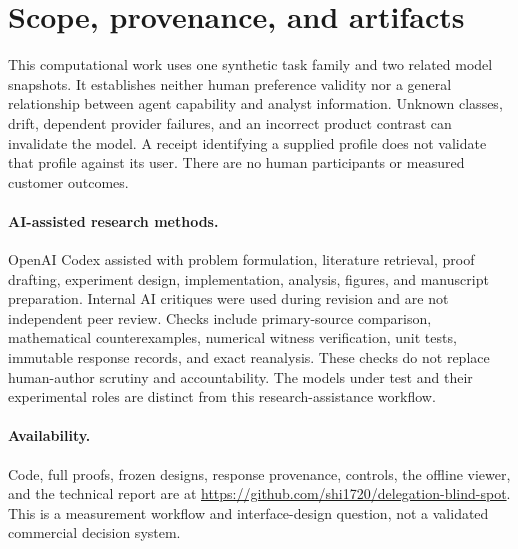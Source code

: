 \documentclass[manuscript,review,anonymous]{acmart}
\begin{document}
\section{Scope, provenance, and artifacts}
This computational work uses one synthetic task family and two related model snapshots. It establishes neither human preference validity nor a general relationship between agent capability and analyst information. Unknown classes, drift, dependent provider failures, and an incorrect product contrast can invalidate the model. A receipt identifying a supplied profile does not validate that profile against its user. There are no human participants or measured customer outcomes.

\paragraph{AI-assisted research methods.}
OpenAI Codex assisted with problem formulation, literature retrieval, proof drafting, experiment design, implementation, analysis, figures, and manuscript preparation. Internal AI critiques were used during revision and are not independent peer review. Checks include primary-source comparison, mathematical counterexamples, numerical witness verification, unit tests, immutable response records, and exact reanalysis. These checks do not replace human-author scrutiny and accountability. The models under test and their experimental roles are distinct from this research-assistance workflow.

\paragraph{Availability.}
Code, full proofs, frozen designs, response provenance, controls, the offline viewer, and the technical report are at \url{https://github.com/shi1720/delegation-blind-spot}. This is a measurement workflow and interface-design question, not a validated commercial decision system.



\end{document}
